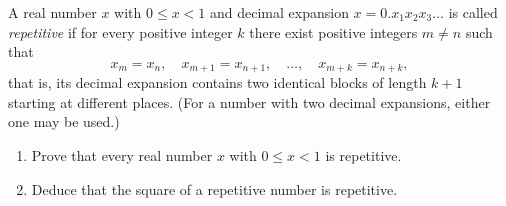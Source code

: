 A real number $x$ with $0\le x<1$ and decimal expansion $x=0.x_1x_2x_3\ldots$ is called \emph{repetitive} if for every positive integer $k$ there exist positive integers $m\ne n$ such that
\[x_m=x_n,\quad x_{m+1}=x_{n+1},\quad\dots,\quad x_{m+k}=x_{n+k},\]
that is, its decimal expansion contains two identical blocks of length $k+1$ starting at different places. (For a number with two decimal expansions, either one may be used.)
\begin{enumerate}
\item[(a)] Prove that every real number $x$ with $0\le x<1$ is repetitive.
\item[(b)] Deduce that the square of a repetitive number is repetitive.
\end{enumerate}
